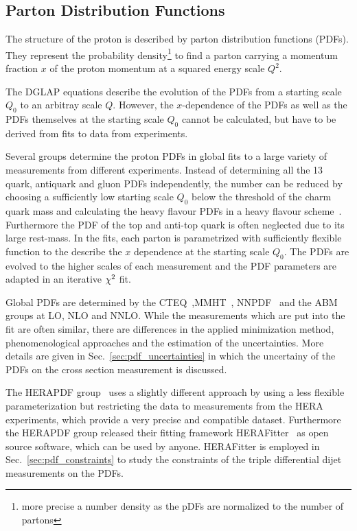 \subsection{Parton Distribution Functions}

The structure of the proton is described by parton distribution functions
(PDFs).  They represent the probability density\footnote{more precise a number
density as the pDFs are normalized to the number of partons} to find a parton
carrying a momentum fraction $x$ of the proton momentum at a squared energy
scale $Q^2$. 

The DGLAP equations describe the evolution of the PDFs from a starting scale
$Q_0$ to an arbitray scale $Q$. However, the $x$-dependence of the PDFs as well
as the PDFs themselves at the starting scale $Q_0$ cannot be calculated, but
have to be derived from fits to data from experiments.

Several groups determine the proton PDFs in global fits to a large variety of
measurements from different experiments. Instead of determining all the 13
quark, antiquark and gluon PDFs independently, the number can be reduced by
choosing a sufficiently low starting scale $Q_0$ below the threshold of the
charm quark mass and calculating the heavy flavour PDFs in a heavy flavour
scheme~\cite{rt_scheme}. Furthermore the PDF of the top and anti-top quark is
often neglected due to its large rest-mass. In the fits, each parton is
parametrized with sufficiently flexible function to the describe the $x$
dependence at the starting scale $Q_0$. The PDFs are evolved to the higher
scales of each measurement and the PDF parameters are adapted in an iterative
$\chi^2$ fit.

Global PDFs are determined by the
CTEQ~\cite{Dulat:2015mca},MMHT~\cite{Harland-Lang:2014zoa},
NNPDF~\cite{Ball:2014uwa} and the ABM~\cite{Alekhin:2013nda} groups at LO, NLO
and NNLO. While the measurements which are put into the fit are often similar,
there are differences in the applied minimization method, phenomenological
approaches and the estimation of the uncertainties. More details are given in
Sec.~\ref{sec:pdf_uncertainties} in which the uncertainy of the PDFs on the
cross section measurement is discussed.

The HERAPDF group~\cite{Abramowicz:2015mha} uses a slightly different approach
by using a less flexible parameterization but restricting the data to
measurements from the HERA experiments, which provide a very precise and
compatible dataset. Furthermore the HERAPDF group released their fitting
framework HERAFitter~\cite{Alekhin:2014irh} as open source software, which can
be used by anyone.  HERAFitter is employed in Sec.~\ref{sec:pdf_constraints} to
study the constraints of the triple differential dijet measurements on the PDFs.

